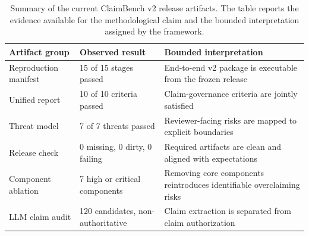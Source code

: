 \begin{table}[t]
\centering
\caption{Summary of the current ClaimBench v2 release artifacts. The table reports the evidence available for the methodological claim and the bounded interpretation assigned by the framework.}
\label{tab:results-summary}
\small
\begin{tabularx}{\textwidth}{p{}p{}X}
\toprule
Artifact group & Observed result & Bounded interpretation \\
\midrule
Reproduction manifest & 15 of 15 stages passed & End-to-end v2 package is executable from the frozen release \\
Unified report & 10 of 10 criteria passed & Claim-governance criteria are jointly satisfied \\
Threat model & 7 of 7 threats passed & Reviewer-facing risks are mapped to explicit boundaries \\
Release check & 0 missing, 0 dirty, 0 failing & Required artifacts are clean and aligned with expectations \\
Component ablation & 7 high or critical components & Removing core components reintroduces identifiable overclaiming risks \\
LLM claim audit & 120 candidates, non-authoritative & Claim extraction is separated from claim authorization \\
\bottomrule
\end{tabularx}
\end{table}
